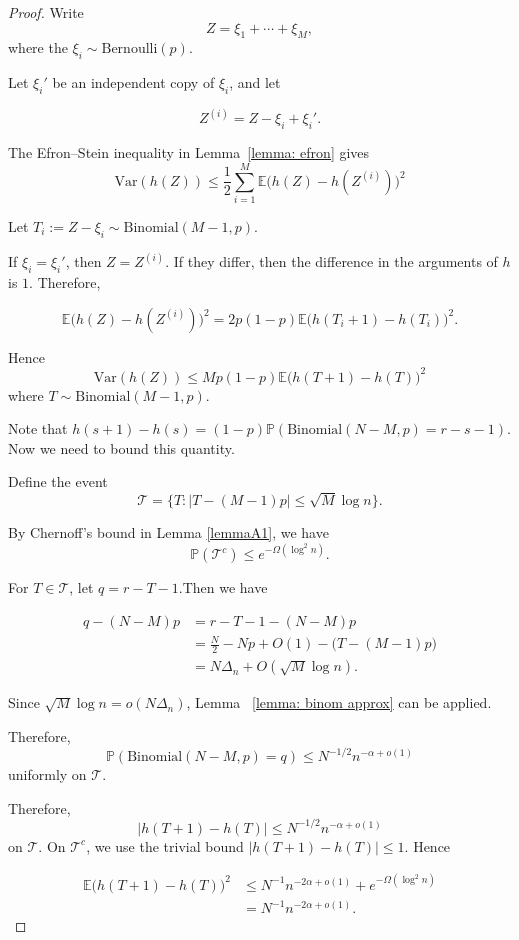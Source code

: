 \documentclass[10pt,a4paper]{amsart}
\renewcommand{\le}{\leqslant}
\begin{document}
\begin{proof}
Write
$$Z=\xi_1+\cdots+\xi_M,$$
where the $\xi_i \sim \text{Bernoulli}(p)$.

Let $\xi_i'$ be an independent copy of $\xi_i$, and let

$$Z^{(i)}= Z-\xi_i+\xi_i'.$$

The Efron–Stein inequality in Lemma~\ref{lemma: efron} gives
$$\text{Var}(h(Z)) \le\frac{1}{2} \sum_{i=1}^{M} \mathbb{E}
\bigl(h(Z)-h(Z^{(i)})\bigr)^2 $$

Let $T_i:=Z-\xi_i \sim \text{Binomial}(M-1,p)$.

If $\xi_i=\xi_i'$, then $Z=Z^{(i)}$. If they differ, then the difference in the arguments of $h$ is $1$. Therefore,

$$\mathbb{E}\bigl(h(Z)-h(Z^{(i)})\bigr)^2= 2p(1-p) \mathbb{E} \bigl(h(T_i+1)-h(T_i)\bigr)^2.
$$

Hence $$\text{Var}(h(Z)) \le Mp(1-p) \mathbb{E}\bigl(h(T+1)-h(T)\bigr)^2 $$
where $T\sim \text{Binomial}(M-1,p)$.

Note that 
$h(s+1)-h(s) =(1-p)\mathbb{P}\left(\text{Binomial}(N-M,p)=r-s-1
\right).$ Now we need to bound this quantity. 

Define the event $$\mathcal{T}= \{T: |T-(M-1)p|\le \sqrt{M} \log n
\}.$$

By Chernoff’s bound in Lemma \ref{lemmaA1}, we have 
$$\mathbb P(\mathcal{T}^c) \le e^{-\Omega(\log^2 n)}.$$

For $T\in\mathcal{T}$, let $q=r-T-1$.Then we have 

\begin{align*}
q-(N-M)p
&= r-T-1-(N-M)p\\
&= \frac{N}{2}-Np+O(1)
-\bigl(T-(M-1)p\bigr)\\
&=N\Delta_n +O(\sqrt M\log n).
\end{align*}

Since $\sqrt{M}\log n=o(N\Delta_n)$, Lemma ~\ref{lemma: binom approx} can be applied. 


Therefore,
$$\mathbb P\left( \text{Binomial}(N-M,p)=q \right)
\le
N^{-1/2}n^{-\alpha+o(1)}$$
uniformly on $\mathcal{T}$.

Therefore, 
$$|h(T+1)-h(T)|
\le
N^{-1/2}n^{-\alpha+o(1)}
$$
on $\mathcal T$. On $\mathcal T^c$, we use the trivial bound $|h(T+1)-h(T)|\le1$. Hence

\begin{align*}
\mathbb E
\bigl(h(T+1)-h(T)\bigr)^2
&\le
N^{-1}n^{-2\alpha+o(1)}
+
e^{-\Omega(\log^2 n)}\\
&=
N^{-1}n^{-2\alpha+o(1)}.
\end{align*}


\end{proof}
\end{document}
